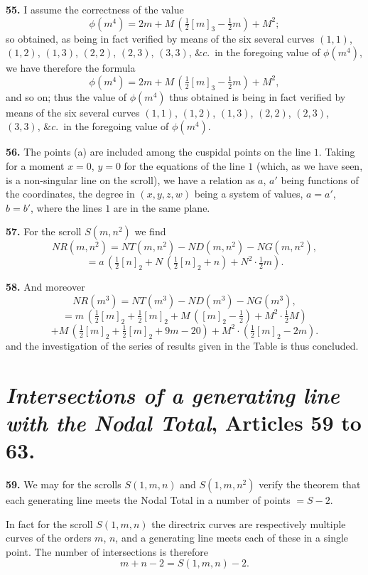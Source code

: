 \documentclass[11pt,a4paper]{article}
\begin{document}
\medskip

\textbf{55.} I assume the correctness of the value
\[
\phi(m^4) = 2m + M\,(\tfrac{1}{2}[m]_3 - \tfrac{1}{2}m) + M^2;
\]
so obtained, as being in fact verified by means of the six several curves $(1, 1)$, $(1, 2)$, $(1, 3)$, $(2, 2)$, $(2, 3)$, $(3, 3)$, $\&c.$\ in the foregoing value of $\phi(m^4)$, we have therefore the formula
\[
\phi(m^4) = 2m + M\,(\tfrac{1}{2}[m]_3 - \tfrac{1}{2}m) + M^2,
\]
and so on; thus the value of $\phi(m^4)$ thus obtained is being in fact verified by means of the six several curves $(1, 1)$, $(1, 2)$, $(1, 3)$, $(2, 2)$, $(2, 3)$, $(3, 3)$, $\&c.$\ in the foregoing value of $\phi(m^4)$.

\medskip

\textbf{56.} The points (a) are included among the cuspidal points on the line $1$. Taking for a moment $x = 0$, $y = 0$ for the equations of the line $1$ (which, as we have seen, is a non-singular line on the scroll), we have a relation as $a$, $a'$ being functions of the coordinates, the degree in $(x, y, z, w)$ being a system of values, $a = a'$, $b = b'$, where the lines $1$ are in the same plane.

\medskip

\textbf{57.} For the scroll $S(m, n^2)$ we find
\[
NR(m, n^2) = NT(m, n^2) - ND(m, n^2) - NG(m, n^2),
\]
\[
= a\,(\tfrac{1}{2}[n]_2 + N\,(\tfrac{1}{2}[n]_2 + n) + N^2 \cdot \tfrac{1}{2}m).
\]

\medskip

\textbf{58.} And moreover
\[
NR(m^3) = NT(m^3) - ND(m^3) - NG(m^3),
\]
\[
= m\,(\tfrac{1}{2}[m]_2 + \tfrac{1}{2}[m]_2 + M\,([m]_2 - \tfrac{1}{2}) + M^2 \cdot \tfrac{1}{2}M)
\]
\[
+ M\,(\tfrac{1}{2}[m]_2 + \tfrac{1}{2}[m]_2 + 9m - 20) + M^2 \cdot (\tfrac{1}{2}[m]_2 - 2m).
\]
and the investigation of the series of results given in the Table is thus concluded.

\section*{\textit{Intersections of a generating line with the Nodal Total}, Articles 59 to 63.}

\textbf{59.} We may for the scrolls $S(1, m, n)$ and $S(1, m, n^2)$ verify the theorem that each generating line meets the Nodal Total in a number of points $= S - 2$.

\medskip

\noindent In fact for the scroll $S(1, m, n)$ the directrix curves are respectively multiple curves of the orders $m$, $n$, and a generating line meets each of these in a single point. The number of intersections is therefore
\[
m + n - 2 = S(1, m, n) - 2.
\]
\end{document}
